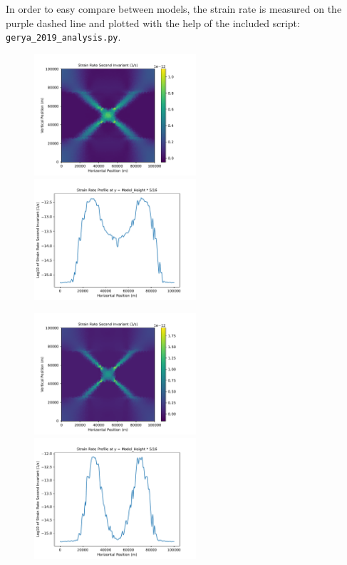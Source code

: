 
In order to easy compare between models, the strain rate is measured on the purple dashed line and plotted with the help of the included script: \verb|gerya_2019_analysis.py|.


\begin{figure}[h]
\centering
\includegraphics[width=6cm]{gerya_2019_damper/strain_rate_field.pdf}
\includegraphics[width=6cm]{gerya_2019_damper/strain_rate_profile.pdf}
\caption{}
\label{fig:gerya_2019_damper_results}
\end{figure}

\begin{figure}[h]
\centering
\includegraphics[width=6cm]{gerya_2019_vp/strain_rate_field.pdf}
\includegraphics[width=6cm]{gerya_2019_vp/strain_rate_profile.pdf}
\caption{}
\label{fig:gerya_2019_vp_results}
\end{figure}

